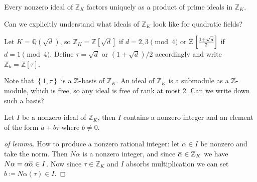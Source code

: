 \begin{proposition}[?]

Every nonzero ideal of \({\mathbb{Z}}_K\) factors uniquely as a product
of prime ideals in \({\mathbb{Z}}_K\).

\end{proposition}

Can we explicitly understand what ideals of \({\mathbb{Z}}_K\) look like
for quadratic fields?

\begin{definition}

Let \(K = {\mathbb{Q}}(\sqrt{d})\), so
\({\mathbb{Z}}_K = {\mathbb{Z}}[\sqrt d]\) if \(d=2,3 \pmod 4\) or
\({\mathbb{Z}}\left[ {1 + \sqrt{d} \over 2} \right]\) if
\(d=1 \pmod 4\). Define \(\tau = \sqrt{d}\) or \((1 + \sqrt{d}) /2\)
accordingly and write \({\mathbb{Z}}_k = {\mathbb{Z}}[\tau]\).

\end{definition}

\begin{remark}

Note that \(\left\{{ 1, \tau }\right\}\) is a
\({\mathbb{Z}}{\hbox{-}}\)basis of \({\mathbb{Z}}_K\). An ideal of
\({\mathbb{Z}}_K\) is a submodule as a \({\mathbb{Z}}{\hbox{-}}\)module,
which is free, so any ideal is free of rank at most 2. Can we write down
such a basis?

\end{remark}

\begin{lemma}[?]

Let \(I\) be a nonzero ideal of \({\mathbb{Z}}_K\), then \(I\) contains
a nonzero integer and an element of the form \(a + b \tau\) where
\(b\neq 0\).

\end{lemma}

\begin{proof}[of lemma]

How to produce a nonzero rational integer: let \(\alpha\in I\) be
nonzero and take the norm. Then \(N \alpha\) is a nonzero integer, and
since
\(\mkern 1.5mu\overline{\mkern-1.5mu\alpha\mkern-1.5mu}\mkern 1.5mu\in {\mathbb{Z}}_K\)
we have
\(N \alpha = \alpha \mkern 1.5mu\overline{\mkern-1.5mu \alpha\mkern-1.5mu}\mkern 1.5mu \in I\).
Now since \(\tau\in {\mathbb{Z}}_K\) and \(I\) absorbs multiplication we
can set \(b \coloneqq N \alpha(\tau) \in I\).

\end{proof}

